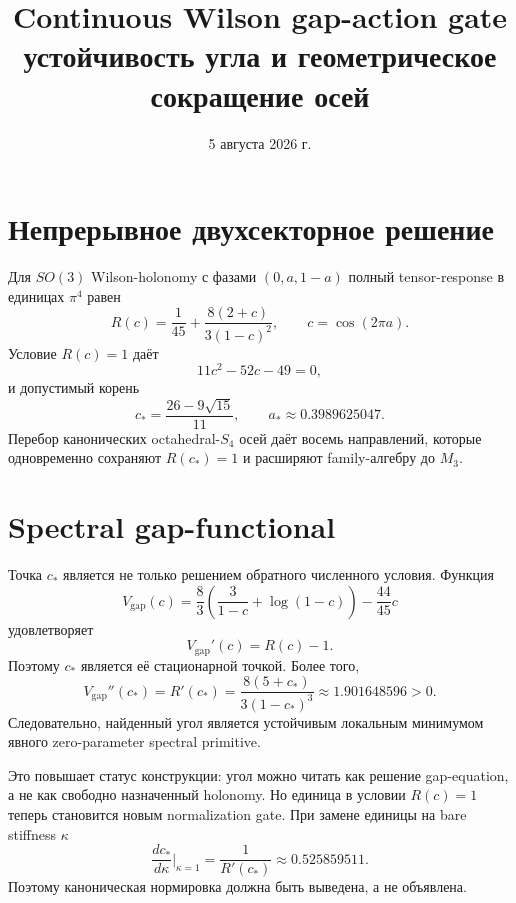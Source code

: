 \documentclass[12pt,a4paper]{article}
\title{Continuous Wilson gap-action gate\\
устойчивость угла и геометрическое сокращение осей}
\author{}
\date{5 августа 2026 г.}
\begin{document}
\maketitle

\section{Непрерывное двухсекторное решение}

Для \(SO(3)\) Wilson-holonomy с фазами \((0,a,1-a)\) полный
tensor-response в единицах \(\pi^4\) равен
\begin{equation}
 R(c)=\frac1{45}+\frac{8(2+c)}{3(1-c)^2},
 \qquad
 c=\cos(2\pi a).
\end{equation}
Условие \(R(c)=1\) даёт
\begin{equation}
 11c^2-52c-49=0,
\end{equation}
и допустимый корень
\begin{equation}
 c_*=\frac{26-9\sqrt{15}}{11},
 \qquad
 a_*\approx0.3989625047.
\end{equation}
Перебор канонических octahedral-\(S_4\) осей даёт восемь направлений,
которые одновременно сохраняют \(R(c_*)=1\) и расширяют family-алгебру до
\(M_3\).

\section{Spectral gap-functional}

Точка \(c_*\) является не только решением обратного численного условия.
Функция
\begin{equation}
 V_{\mathrm{gap}}(c)
 =
 \frac83\left(
 \frac3{1-c}+\log(1-c)
 \right)
 -\frac{44}{45}c
\end{equation}
удовлетворяет
\begin{equation}
 V_{\mathrm{gap}}'(c)=R(c)-1.
\end{equation}
Поэтому \(c_*\) является её стационарной точкой. Более того,
\begin{equation}
 V_{\mathrm{gap}}''(c_*)
 =R'(c_*)
 =\frac{8(5+c_*)}{3(1-c_*)^3}
 \approx1.901648596>0.
\end{equation}
Следовательно, найденный угол является устойчивым локальным минимумом
явного zero-parameter spectral primitive.

Это повышает статус конструкции: угол можно читать как решение gap-equation,
а не как свободно назначенный holonomy. Но единица в условии
\(R(c)=1\) теперь становится новым normalization gate. При замене единицы на
bare stiffness \(\kappa\)
\begin{equation}
 \frac{dc_*}{d\kappa}\bigg|_{\kappa=1}
 =\frac1{R'(c_*)}
 \approx0.525859511.
\end{equation}
Поэтому каноническая нормировка должна быть выведена, а не объявлена.
\end{document}
